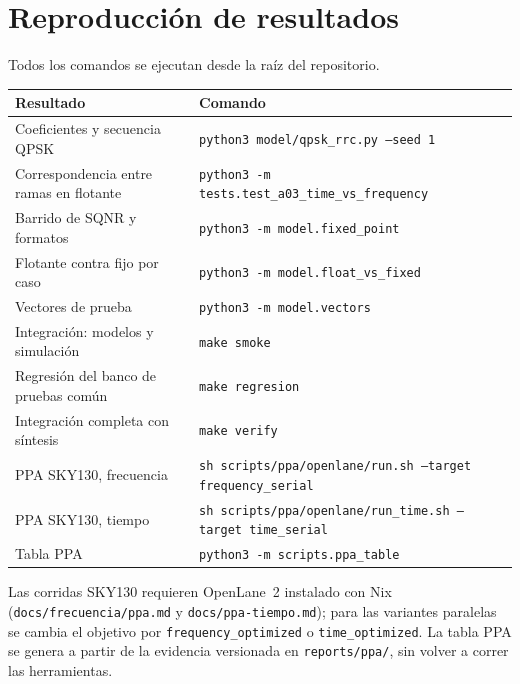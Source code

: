 \section{Reproducción de resultados}\label{app:comandos}

Todos los comandos se ejecutan desde la raíz del repositorio.

\begin{center}
\footnotesize
\begin{tabular}{ll}
  \toprule
  Resultado & Comando \\
  \midrule
  Coeficientes y secuencia QPSK & \texttt{python3 model/qpsk\_rrc.py --seed 1} \\
  Correspondencia entre ramas en flotante & \texttt{python3 -m tests.test\_a03\_time\_vs\_frequency} \\
  Barrido de SQNR y formatos & \texttt{python3 -m model.fixed\_point} \\
  Flotante contra fijo por caso & \texttt{python3 -m model.float\_vs\_fixed} \\
  Vectores de prueba & \texttt{python3 -m model.vectors} \\
  Integración: modelos y simulación & \texttt{make smoke} \\
  Regresión del banco de pruebas común & \texttt{make regresion} \\
  Integración completa con síntesis & \texttt{make verify} \\
  PPA SKY130, frecuencia & \texttt{sh scripts/ppa/openlane/run.sh --target frequency\_serial} \\
  PPA SKY130, tiempo & \texttt{sh scripts/ppa/openlane/run\_time.sh --target time\_serial} \\
  Tabla PPA & \texttt{python3 -m scripts.ppa\_table} \\
  \bottomrule
\end{tabular}
\end{center}

{\sloppy Las corridas SKY130 requieren OpenLane~2 instalado con Nix (\texttt{docs/frecuencia/ppa.md} y \texttt{docs/ppa-tiempo.md}); para las variantes paralelas se cambia el objetivo por \texttt{frequency\_optimized} o \texttt{time\_optimized}. La tabla PPA se genera a partir de la evidencia versionada en \texttt{reports/ppa/}, sin volver a correr las herramientas.\par}
